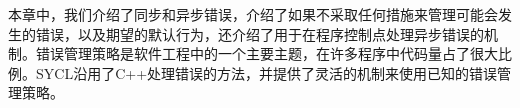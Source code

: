 本章中，我们介绍了同步和异步错误，介绍了如果不采取任何措施来管理可能会发生的错误，以及期望的默认行为，还介绍了用于在程序控制点处理异步错误的机制。错误管理策略是软件工程中的一个主要主题，在许多程序中代码量占了很大比例。SYCL沿用了C++处理错误的方法，并提供了灵活的机制来使用已知的错误管理策略。\par


\newpage